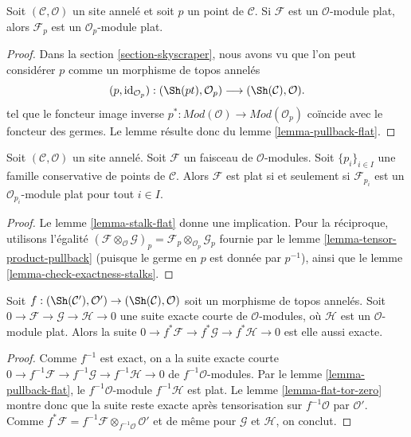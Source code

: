 \begin{lemma}
\label{lemma-stalk-flat}
Soit $(\mathcal{C}, \mathcal{O})$ un site annelé et soit $p$ un point de
$\mathcal{C}$. Si $\mathcal{F}$ est un $\mathcal{O}$-module plat, alors
$\mathcal{F}_p$ est un $\mathcal{O}_p$-module plat.
\end{lemma}

\begin{proof}
Dans la section \ref{section-skyscraper}, nous avons vu que l'on peut
considérer $p$ comme un morphisme de topos annelés
$$
(p, \text{id}_{\mathcal{O}_p}) :
(\Sh(pt), \mathcal{O}_p)
\longrightarrow
(\Sh(\mathcal{C}), \mathcal{O}).
$$
tel que le foncteur image inverse
$p^* : \textit{Mod}(\mathcal{O}) \to \textit{Mod}(\mathcal{O}_p)$
coïncide avec le foncteur des germes. Le lemme résulte donc du
lemme \ref{lemma-pullback-flat}.
\end{proof}

\begin{lemma}
\label{lemma-check-flat-stalks}
Soit $(\mathcal{C}, \mathcal{O})$ un site annelé. Soit $\mathcal{F}$ un
faisceau de $\mathcal{O}$-modules. Soit $\{p_i\}_{i \in I}$ une famille
conservative de points de $\mathcal{C}$. Alors $\mathcal{F}$ est plat si et
seulement si $\mathcal{F}_{p_i}$ est un $\mathcal{O}_{p_i}$-module plat pour
tout $i \in I$.
\end{lemma}

\begin{proof}
Le lemme \ref{lemma-stalk-flat} donne une implication. Pour la réciproque,
utilisons l'égalité
$(\mathcal{F} \otimes_\mathcal{O} \mathcal{G})_p =
\mathcal{F}_p \otimes_{\mathcal{O}_p} \mathcal{G}_p$
fournie par le lemme \ref{lemma-tensor-product-pullback} (puisque le germe en
$p$ est donnée par $p^{-1}$), ainsi que le
lemme \ref{lemma-check-exactness-stalks}.
\end{proof}

\begin{lemma}
\label{lemma-pullback-ses}
Soit
$f : (\Sh(\mathcal{C}'), \mathcal{O}') \to (\Sh(\mathcal{C}), \mathcal{O})$
soit un morphisme de topos annelés. Soit
$0 \to \mathcal{F} \to \mathcal{G} \to \mathcal{H} \to 0$
une suite exacte courte de $\mathcal{O}$-modules, où $\mathcal{H}$ est un
$\mathcal{O}$-module plat. Alors la suite
$0 \to f^*\mathcal{F} \to f^*\mathcal{G} \to f^*\mathcal{H} \to 0$
est elle aussi exacte.
\end{lemma}

\begin{proof}
Comme $f^{-1}$ est exact, on a la suite exacte courte
$0 \to f^{-1}\mathcal{F} \to f^{-1}\mathcal{G} \to f^{-1}\mathcal{H} \to 0$
de $f^{-1}\mathcal{O}$-modules. Par le lemme \ref{lemma-pullback-flat}, le
$f^{-1}\mathcal{O}$-module $f^{-1}\mathcal{H}$ est plat. Le
lemme \ref{lemma-flat-tor-zero} montre donc que la suite reste exacte après
tensorisation sur $f^{-1}\mathcal{O}$ par $\mathcal{O}'$. Comme
$f^*\mathcal{F} = f^{-1}\mathcal{F} \otimes_{f^{-1}\mathcal{O}} \mathcal{O}'$
et de même pour $\mathcal{G}$ et $\mathcal{H}$, on conclut.
\end{proof}





